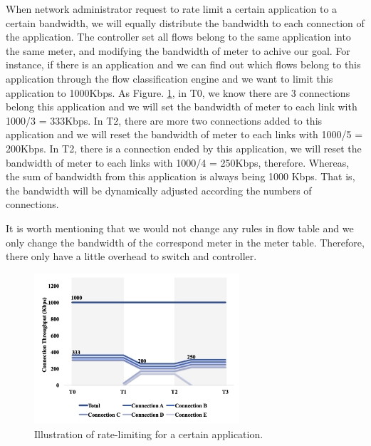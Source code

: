 \documentclass[journal]{IEEEtran}
\begin{document}
When network administrator request to rate limit a certain application to a certain bandwidth, we will equally distribute the bandwidth to each connection of the application. The controller set all flows belong to the same application into the same meter, and modifying the bandwidth of meter to achive our goal. For instance, if there is an application and we can find out which flows belong to this application through the flow classification engine and we want to limit this application to 1000Kbps. As Figure. \ref{fig:mft_qos_rate_app}, in T0, we know there are 3 connections belong this application and we will set the bandwidth of meter to each link with 1000/3 = 333Kbps. In T2, there are more two connections added to this application and we will reset the bandwidth of meter to each links with 1000/5 = 200Kbps. In T2, there is a connection ended by this application, we will reset the bandwidth of meter to each links with 1000/4 = 250Kbps, therefore. Whereas, the sum of bandwidth from this application is always being 1000 Kbps. That is, the bandwidth will be dynamically adjusted according the numbers of connections.

It is worth mentioning that we would not change any rules in flow table and we only change the bandwidth of the correspond meter in the meter table. Therefore, there only have a little overhead to switch and controller.
\begin{figure}[!t]
\centering
\includegraphics[width=3in]{./figures/mft_qos_rate_app}
\caption{Illustration of rate-limiting for a certain application.}
\label{fig:mft_qos_rate_app}
\end{figure}
\end{document}
